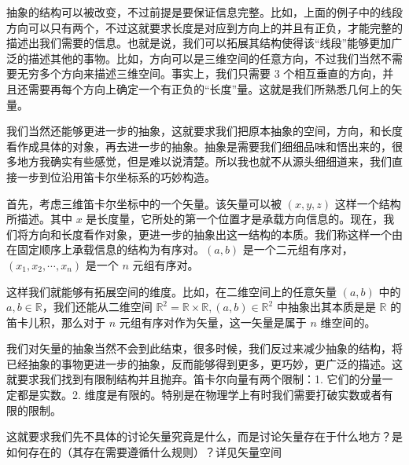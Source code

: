 抽象的结构可以被改变，不过前提是要保证信息完整。比如，上面的例子中的线段方向可以只有两个，不过这就要求长度是对应到方向上的并且有正负，才能完整的描述出我们需要的信息。也就是说，我们可以拓展其结构使得该“线段”能够更加广泛的描述其他的事物。比如，方向可以是三维空间的任意方向，不过我们当然不需要无穷多个方向来描述三维空间。事实上，我们只需要 $3$ 个相互垂直的方向，并且还需要再每个方向上确定一个有正负的“长度”量。这就是我们所熟悉几何上的矢量。

我们当然还能够更进一步的抽象，这就要求我们把原本抽象的空间，方向，和长度看作成具体的对象，再去进一步的抽象。抽象是需要我们细细品味和悟出来的，很多地方我确实有些感觉，但是难以说清楚。所以我也就不从源头细细道来，我们直接一步到位沿用笛卡尔坐标系的巧妙构造。

首先，考虑三维笛卡尔坐标中的一个矢量。该矢量可以被 $(x,y,z)$ 这样一个结构所描述。其中 $x$ 是长度量，它所处的第一个位置才是承载方向信息的。现在，我们将方向和长度看作对象，更进一步的抽象出这一结构的本质。我们称这样一个由在固定顺序上承载信息的结构为有序对。$(a,b)$ 是一个二元组有序对，$(x_1,x_2,\cdots,x_n)$ 是一个 $n$ 元组有序对。

这样我们就能够有拓展空间的维度。比如，在二维空间上的任意矢量 $(a,b)$ 中的 $a,b\in \mathbb R$，我们还能从二维空间 $\mathbb R^2 = \mathbb R\times \mathbb R,(a,b)\in \mathbb R^2$ 中抽象出其本质是是 $\mathbb R$ 的笛卡儿积，那么对于 $n$ 元组有序对作为矢量，这一矢量是属于 $n$ 维空间的。

我们对矢量的抽象当然不会到此结束，很多时候，我们反过来减少抽象的结构，将已经抽象的事物更进一步的抽象，反而能够得到更多，更巧妙，更广泛的描述。这就要求我们找到有限制结构并且抛弃。笛卡尔向量有两个限制：1. 它们的分量一定都是实数。2. 维度是有限的。特别是在物理学上有时我们需要打破实数或者有限的限制。

这就要求我们先不具体的讨论矢量究竟是什么，而是讨论矢量存在于什么地方？是如何存在的（其存在需要遵循什么规则）？详见矢量空间
